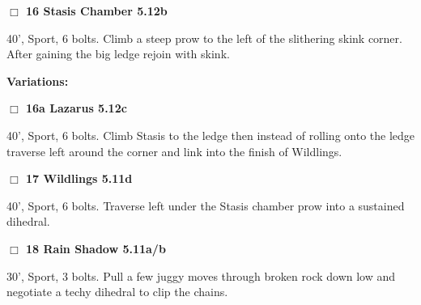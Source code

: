 	\begin{multicols}{2}

\needspace{2em}
\label{rt:Stasis Chamber}
\colorbox{Goldenrod!20}{
\parbox{0.95\linewidth}{
\hspace{-1ex}\textbf{$\Box$
16 Stasis Chamber 5.12b  
}}}
\begin{adjustwidth}{1.3em}{}			

40', Sport, 6 bolts. Climb a steep prow to the left of the slithering skink corner. After gaining the big ledge rejoin with skink.
\end{adjustwidth}


\begin{adjustwidth}{0.5cm}{}				
\needspace{4em}
\textbf{Variations:} \newline

\needspace{2em}
\label{vr:Lazarus}
\colorbox{Goldenrod!20}{
\parbox{0.95\linewidth}{
\hspace{-1ex}\textbf{$\Box$
16a Lazarus 5.12c  
}}}
\begin{adjustwidth}{1.3em}{}			

40', Sport, 6 bolts. Climb Stasis to the ledge then instead of rolling onto the ledge traverse left around the corner and link into the finish of Wildlings.
\end{adjustwidth}



\end{adjustwidth}


\needspace{2em}
\label{rt:Wildlings}
\colorbox{RoyalBlue!20}{
\parbox{0.95\linewidth}{
\hspace{-1ex}\textbf{$\Box$
17 Wildlings 5.11d  
}}}
\begin{adjustwidth}{1.3em}{}			

40', Sport, 6 bolts. Traverse left under the Stasis chamber prow into a sustained dihedral.
\end{adjustwidth}




\needspace{2em}
\label{rt:Rain Shadow}
\colorbox{RoyalBlue!20}{
\parbox{0.95\linewidth}{
\hspace{-1ex}\textbf{$\Box$
18 Rain Shadow 5.11a/b  
}}}
\begin{adjustwidth}{1.3em}{}			

30', Sport, 3 bolts. Pull a few juggy moves through broken rock down low and negotiate a techy dihedral to clip the chains.
\end{adjustwidth}





\end{multicols}
